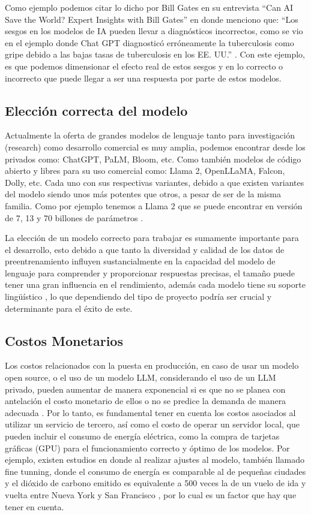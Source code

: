 Como ejemplo podemos citar lo dicho por Bill Gates en su entrevista ``Can AI Save the World? Expert Insights with Bill Gates'' en donde menciono que: 
``Los sesgos en los modelos de IA pueden llevar a diagnósticos incorrectos, como se vio en el ejemplo donde Chat GPT diagnosticó erróneamente la 
tuberculosis como gripe debido a las bajas tasas de tuberculosis en los EE. UU.'' \cite{billgates1}. Con este ejemplo, es que podemos dimensionar el efecto real de estos sesgos y
en lo correcto o incorrecto que puede llegar a ser una respuesta por parte de estos modelos.

\subsection{Elección correcta del modelo}

Actualmente la oferta de grandes modelos de lenguaje tanto para investigación (research) como desarrollo comercial es muy amplia, podemos encontrar desde los privados como: ChatGPT, PaLM, Bloom, etc. 
Como también modelos de código abierto y libres para su uso comercial como: Llama 2, OpenLLaMA, Falcon, Dolly, etc. \cite{modelos2} Cada uno con sus respectivas variantes, debido a que existen 
variantes del modelo siendo unos más potentes que otros, a pesar de ser de la misma familia. Como por ejemplo tenemos a Llama 2 que se puede encontrar en versión de 7, 13 y 70 billones de parámetros \cite{modelos3}. 

La elección de un modelo correcto para trabajar es sumamente importante para el desarrollo, esto debido a que tanto la diversidad y calidad de los datos de preentrenamiento influyen 
sustancialmente en la capacidad del modelo de lenguaje para comprender y proporcionar respuestas precisas, el tamaño puede tener una 
gran influencia en el rendimiento, además cada modelo tiene su soporte lingüístico \cite{modelos1}, lo que dependiendo del tipo de proyecto podría ser crucial y determinante para el éxito de este.  


\subsection{Costos Monetarios}
Los costos relacionados con la puesta en producción, en caso de usar un modelo open source, o el uso de un modelo LLM, considerando el uso de un LLM privado, pueden aumentar de manera exponencial si es que no se planea con antelación el costo monetario de ellos o no se predice la demanda de manera adecuada \cite{cost4}. Por lo tanto, es fundamental tener en 
cuenta los costos asociados al utilizar un servicio de tercero, así como el costo de operar un servidor local, que pueden incluir el consumo de energía eléctrica, como la compra de tarjetas gráficas (GPU) para el funcionamiento correcto y óptimo de los modelos.
Por ejemplo, existen estudios en donde al realizar ajustes al modelo, también llamado fine tunning, donde el consumo de energía es comparable al de pequeñas ciudades y el dióxido 
de carbono emitido es equivalente a 500 veces la de un vuelo de ida y vuelta entre Nueva York y San Francisco \cite{ft1}, por lo cual es un factor que hay que tener en cuenta. 


